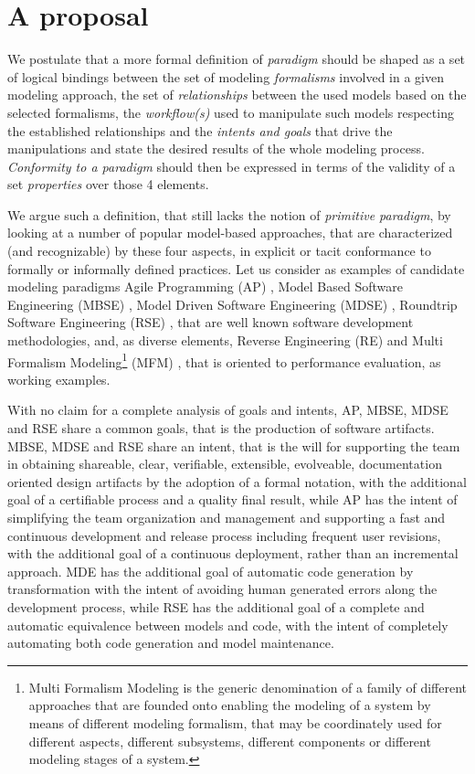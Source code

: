 \section{A proposal}

We postulate that a more formal definition of \textit{paradigm} should be shaped as a set of logical bindings between the set of modeling \textit{formalisms} involved in a given modeling approach, the set of \textit{relationships} between the used models based on the selected formalisms, the \textit{workflow(s)} used to manipulate such models respecting the established relationships and the \textit{intents and goals} that drive the manipulations and state the desired results of the whole modeling process.
\textit{Conformity to a paradigm} should then be expressed in terms of the validity of a set \textit{properties} over those 4 elements.

We argue such a definition, that still lacks the notion of \textit{primitive paradigm}, by looking at a number of popular model-based approaches, that are characterized (and recognizable) by these four aspects, in explicit or tacit conformance to formally or informally defined practices. Let us consider as examples of candidate modeling paradigms Agile Programming (AP) \cite{}, Model Based Software Engineering (MBSE) \cite{}, Model Driven Software Engineering (MDSE) \cite{}, Roundtrip Software Engineering (RSE) \cite{}, that are well known software development methodologies, and, as diverse elements, Reverse Engineering (RE) \cite{} and Multi Formalism Modeling\footnote{Multi Formalism Modeling is the generic denomination of a family of different approaches that are founded onto enabling the modeling of a system by means of different modeling formalism, that may be coordinately used for different aspects, different subsystems, different components or different modeling stages of a system.} (MFM) \cite{MauroChapter}, that is oriented to performance evaluation, as working examples.

With no claim for a complete analysis of goals and intents, AP, MBSE, MDSE and RSE share a common goals, that is the production of software artifacts. MBSE, MDSE and RSE share an intent, that is the will for supporting the team in obtaining shareable, clear, verifiable, extensible, evolveable, documentation oriented design artifacts by the adoption of a formal notation, with the additional goal of a certifiable process and a quality final result, while AP has the intent of simplifying the team organization and management and supporting a fast and continuous development and release process including frequent user revisions, with the additional goal of a continuous deployment, rather than an incremental approach. MDE has the additional goal of automatic code generation by transformation with the intent of avoiding human generated errors along the development process, while RSE has the additional goal of a complete and automatic equivalence between models and code, with the intent of completely automating both code generation and model maintenance.


